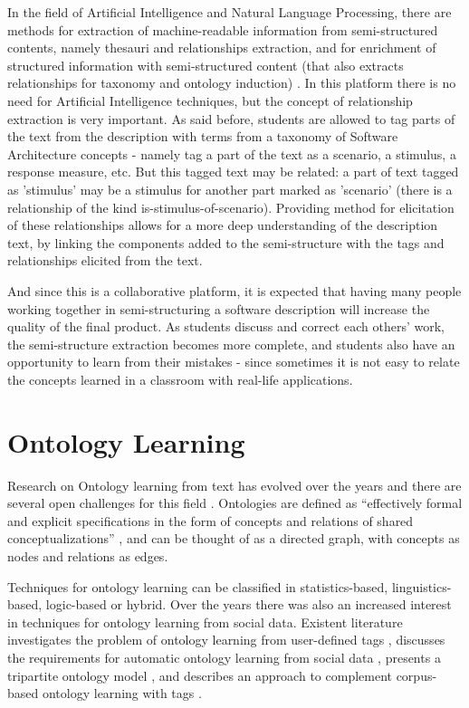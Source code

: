 In the field of Artificial Intelligence and Natural Language Processing, there are methods for extraction of machine-readable information from semi-structured contents, namely thesauri and relationships extraction, and for enrichment of structured information with semi-structured content (that also extracts relationships for taxonomy and ontology induction) \cite{hovy2013collaboratively}. In this platform there is no need for Artificial Intelligence techniques, but the concept of relationship extraction is very important. As said before, students are allowed to tag parts of the text from the description with terms from a taxonomy of Software Architecture concepts - namely tag a part of the text as a scenario, a stimulus, a response measure, etc. But this tagged text may be related: a part of text tagged as 'stimulus' may be a stimulus for another part marked as 'scenario' (there is a relationship of the kind is-stimulus-of-scenario). Providing method for elicitation of these relationships allows for a more deep understanding of the description text, by linking the components added to the semi-structure with the tags and relationships elicited from the text.

And since this is a collaborative platform, it is expected that having many people working together in semi-structuring a software description will increase the quality of the final product. 
As students discuss and correct each others' work, the semi-structure extraction becomes more complete, and students also have an opportunity to learn from their mistakes - since sometimes it is not easy to relate the concepts learned in a classroom with real-life applications.

\section{Ontology Learning}
Research on Ontology learning from text has evolved over the years and there are several open challenges for this field \cite{wong2012ontology}. Ontologies are defined as ``effectively formal and explicit specifications in the form of concepts and relations of shared conceptualizations'' \cite{gruber1993translation}, and can be thought of as a directed graph, with concepts as nodes and relations as edges.
 
Techniques for ontology learning can be classified in statistics-based, linguistics-based, logic-based or hybrid. Over the years there was also an increased interest in techniques for ontology learning from social data. Existent literature investigates the problem of ontology learning from user-defined tags \cite{tang2009towards}, discusses the requirements for automatic ontology learning from social data \cite{kotis2011automated}, presents a tripartite ontology model \cite{mika2007ontologies}, and describes an approach to complement corpus-based ontology learning with tags \cite{weichselbraun2010augmenting}.

